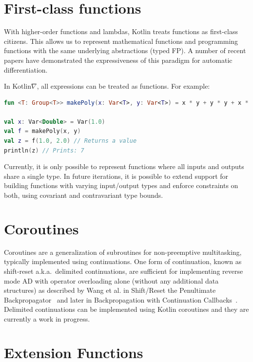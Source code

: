 \documentclass[12pt,initial,twoside,maitrise]{dms}
\numberwithin{equation}{section}
\numberwithin{table}{chapter}
\numberwithin{figure}{chapter}
\begin{document}
\section{First-class functions}\label{sec:first-class-functions}

With higher-order functions and lambdas, Kotlin treats functions as first-class citizens. This allows us to represent mathematical functions and programming functions with the same underlying abstractions (typed FP). A number of recent papers have demonstrated the expressiveness of this paradigm for automatic differentiation.

In Kotlin$\nabla$, all expressions can be treated as functions. For example:

\begin{lstlisting}[caption={Simple code listing.}, language=Kotlin]
fun <T: Group<T>> makePoly(x: Var<T>, y: Var<T>) = x * y + y * y + x * x

val x: Var<Double> = Var(1.0)
val f = makePoly(x, y)
val z = f(1.0, 2.0) // Returns a value
println(z) // Prints: 7
\end{lstlisting}

Currently, it is only possible to represent functions where all inputs and outputs share a single type. In future iterations, it is possible to extend support for building functions with varying input/output types and enforce constraints on both, using covariant and contravariant type bounds.

\section{Coroutines}\label{sec:coroutines}

Coroutines are a generalization of subroutines for non-preemptive multitasking, typically implemented using continuations. One form of continuation, known as shift-reset a.k.a.\ delimited continuations, are sufficient for implementing reverse mode AD with operator overloading alone (without any additional data structures) as described by Wang et al. in Shift/Reset the Penultimate Backpropagator~\cite{wang2018demystifying} and later in Backpropagation with Continuation Callbacks~\cite{wang2018backpropagation}. Delimited continuations can be implemented using Kotlin coroutines and they are currently a work in progress.

\section{Extension Functions}\label{sec:extension-functions}
\end{document}

